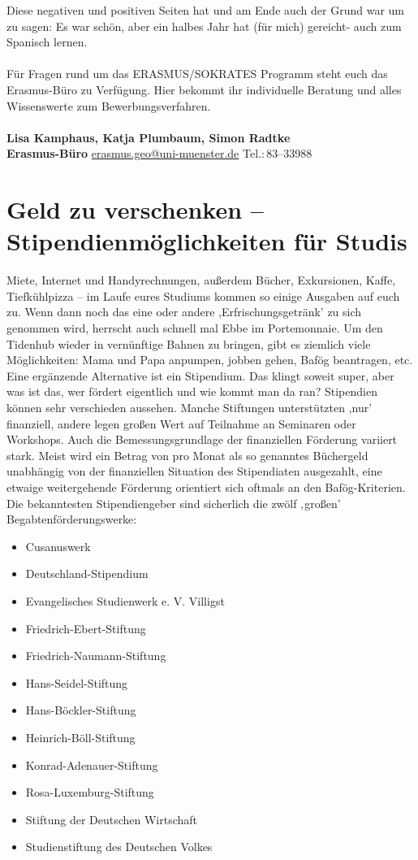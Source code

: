 Diese negativen und positiven Seiten hat und am Ende auch der Grund war um zu sagen: Es war schön, aber ein halbes Jahr hat (für mich) gereicht- auch zum Spanisch lernen. 
 \\
\\
Für Fragen rund um das ERASMUS/SOKRATES Programm steht euch das Erasmus-Büro zu Verfügung. Hier bekommt ihr individuelle Beratung und alles Wissenswerte zum Bewerbungsverfahren.\\ \\
\textbf{Lisa Kamphaus, Katja Plumbaum, Simon Radtke}\\
\textbf{Erasmus-Büro}   \url{erasmus.geo@uni-muenster.de}	Tel.:\,83--33988\\ 

\section{Geld zu verschenken – Stipendienmöglichkeiten für Studis}
Miete, Internet und Handyrechnungen, außerdem Bücher, Exkursionen, Kaffe, Tiefkühlpizza – im Laufe eures Studiums kommen so einige Ausgaben auf euch zu. Wenn dann noch das eine oder andere ,Erfrischungsgetränk' zu sich genommen wird, herrscht auch schnell mal Ebbe im Portemonnaie. Um den Tidenhub wieder in vernünftige Bahnen zu bringen, gibt es ziemlich viele Möglichkeiten: Mama und Papa anpumpen, jobben gehen, Bafög beantragen, etc. Eine ergänzende Alternative ist ein Stipendium. Das klingt soweit super, aber was ist das, wer fördert eigentlich und wie kommt man da ran?
Stipendien können sehr verschieden aussehen. Manche Stiftungen unterstützten ‚nur’ finanziell, andere legen großen Wert auf Teilnahme an Seminaren oder Workshops. Auch die Bemessungsgrundlage der finanziellen Förderung variiert stark. Meist wird ein Betrag von \unit[60-100]{\officialeuro} pro Monat als so genanntes Büchergeld unabhängig von der finanziellen Situation des Stipendiaten ausgezahlt, eine etwaige weitergehende Förderung orientiert sich oftmals an den Bafög-Kriterien.
Die bekanntesten Stipendiengeber sind sicherlich die zwölf ‚großen’ Begabtenförderungswerke:
\begin{itemize}
 \item Cusanuswerk
 \item Deutschland-Stipendium
 \item Evangelisches Studienwerk e. V. Villigst
 \item Friedrich-Ebert-Stiftung
 \item Friedrich-Naumann-Stiftung
 \item Hans-Seidel-Stiftung
 \item Hans-Böckler-Stiftung
 \item Heinrich-Böll-Stiftung
 \item Konrad-Adenauer-Stiftung
 \item Rosa-Luxemburg-Stiftung
 \item Stiftung der Deutschen Wirtschaft
 \item Studienstiftung des Deutschen Volkes 
\end{itemize}
